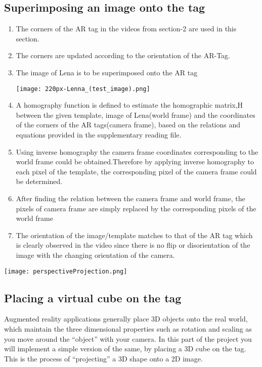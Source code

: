 \documentclass{article}
\begin{document}
\subsection{Superimposing an image onto the tag}
\begin{enumerate}
    \item  The corners of the AR tag in the videos from section-2 are used in this section.
    \item  The corners are updated according to the orientation of the AR-Tag.
    \item  The image of Lena is to be superimposed onto the AR tag
    \begin{center}

    \texttt{[image: 220px-Lenna\_(test\_image).png]}

    
\end{center}
    \item A homography function is defined to estimate the homographic matrix,H between the given template,
image of Lena(world frame) and the coordinates of the corners of the AR tags(camera frame), based
on the relations and equations provided in the supplementary reading file.
    \item Using inverse homography the camera frame coordinates corresponding to the world frame could be
obtained.Therefore by applying inverse homography to each pixel of the template, the corresponding pixel
of the camera frame could be determined.
    \item After finding the relation between the camera frame and world frame, the pixels of camera frame are
simply replaced by the corresponding pixels of the world frame
    \item The orientation of the image/template matches to that of the AR tag which is clearly observed in the
video since there is no flip or disorientation of the image with the changing orientation of the camera.
\end{enumerate}
\begin{center}

    \texttt{[image: perspectiveProjection.png]}

    
\end{center}
\subsection{Placing a virtual cube on the tag}
Augmented reality applications generally place 3D objects onto the real world, which maintain the three
dimensional properties such as rotation and scaling as you move around the “object” with your camera. In
this part of the project you will implement a simple version of the same, by placing a 3D cube on the tag.
This is the process of “projecting” a 3D shape onto a 2D image.
\end{document}
